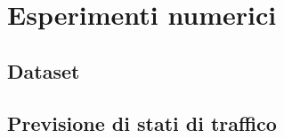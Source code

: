 
\chapter{Esperimenti numerici}
\label{cap:esperimenti}

\lipsum[1]

\section{Dataset}
\lipsum[2]

\section{Previsione di stati di traffico}
\lipsum[3]